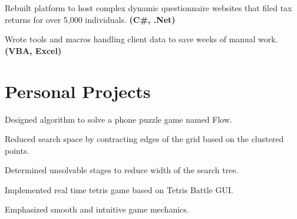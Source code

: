 \documentclass[letterpaper]{kevin-resume} %
\begin{document}
\begin{minipage}[t]{0.63\textwidth}
\sectionspace %


\begin{tightitemize}
	\item Rebuilt platform to host complex dynamic questionnaire websites that filed tax returns for over 5,000 individuals. \textbf{(C\#, .Net)}
	\item Wrote tools and macros handling client data to save weeks of manual work. \textbf{(VBA, Excel)}
\end{tightitemize}

\sectionspace %


\sectionspace %

\section{Personal Projects}

\begin{tightitemize}
	\item Designed algorithm to solve a phone puzzle game named Flow.
 	\item Reduced search space by contracting edges of the grid based on the clustered points.
 	\item Determined unsolvable stages to reduce width of the search tree.
\end{tightitemize}

\sectionspace %


\begin{tightitemize}
	\item Implemented real time tetris game based on Tetris Battle GUI.
	\item Emphasized smooth and intuitive game mechanics.
\end{tightitemize}

\sectionspace %


\end{minipage} %
\end{document}

